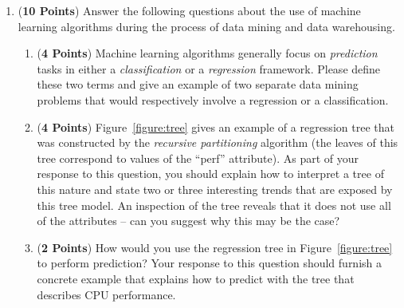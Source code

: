 \documentclass[12pt]{article}
\begin{document}
\begin{enumerate}
\begin{enumerate}

\end{enumerate}

\newpage

\item ({\bf 10 Points}) Answer the following questions about the use
  of machine learning algorithms during the process of data mining and
  data warehousing.

  \begin{enumerate}

  \item ({\bf 4 Points}) Machine learning algorithms generally focus
    on {\em prediction} tasks in either a {\em classification} or a
    {\em regression} framework.  Please define these two terms and
    give an example of two separate data mining problems that would
    respectively involve a regression or a classification.

  \item ({\bf 4 Points}) Figure~\ref{figure:tree} gives an example of
    a regression tree that was constructed by the {\em recursive
      partitioning} algorithm (the leaves of this tree correspond to
    values of the ``perf'' attribute).  As part of your response to
    this question, you should explain how to interpret a tree of this
    nature and state two or three interesting trends that are exposed
    by this tree model.  An inspection of the tree reveals that it
    does not use all of the attributes -- can you suggest why this may
    be the case?

  \item ({\bf 2 Points}) How would you use the regression tree in
    Figure~\ref{figure:tree} to perform prediction?  Your response to
    this question should furnish a concrete example that explains how
    to predict with the tree that describes CPU performance.

\end{enumerate}

\end{enumerate}
\end{document}
